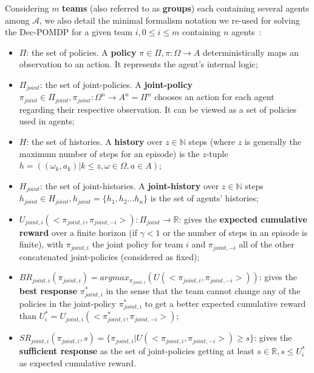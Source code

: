 \documentclass[doubleblind]{ecai}
\begin{document}
Considering $m$ \textbf{teams} (also referred to as \textbf{groups}) each containing several agents among $\mathcal{A}$, we also detail the minimal formalism notation we re-used for solving the Dec-POMDP for a given team $i, 0 \leq i \leq m$ containing $n$ agents~\citep{Beynier2013,Albrecht2024}:

\begin{itemize}

    \item $\Pi$: the set of policies. A \textbf{policy} $\pi \in \Pi, \pi: \Omega \rightarrow A$ deterministically maps an observation to an action. It represents the agent's internal logic;
    \item $\Pi_{joint}$: the set of joint-policies. A \textbf{joint-policy} $\pi_{joint} \in \Pi_{joint}, \pi_{joint}: \Omega^n \rightarrow A^n = \Pi^n$ chooses an action for each agent regarding their respective observation. It can be viewed as a set of policies used in agents;
    \item $H$: the set of histories. A \textbf{history} over $z \in \mathbb{N}$ steps (where $z$ is generally the maximum number of steps for an episode) is the $z$-tuple $h = ((\omega_{k}, a_{k}) | k \leq z, \omega \in \Omega, a \in A)$;
    \item $H_{joint}$: the set of joint-histories. A \textbf{joint-history} over $z \in \mathbb{N}$ steps $h_{joint} \in H_{joint}, h_{joint} = \{h_1,h_2...h_n\}$ is the set of agents' histories;
    \item $U_{joint,i}(<\pi_{joint,i}, \pi_{joint,-i}>): \Pi_{joint} \rightarrow \mathbb{R}$: gives the \textbf{expected cumulative reward} over a finite horizon (if $\gamma < 1$ or the number of steps in an episode is finite), with $\pi_{joint,i}$ the joint policy for team $i$ and $\pi_{joint,-i}$ all of the other concatenated joint-policies (considered as fixed);
    \item $BR_{joint,i}(\pi_{joint,i}) = argmax_{\pi_{joint,i}}(U(<\pi_{joint,i},\pi_{joint,-i}>))$: gives the \textbf{best response} $\pi_{joint,i}^*$ in the sense that the team cannot change any of the policies in the joint-policy $\pi_{joint,i}^*$ to get a better expected cumulative reward than $U_i^* = U_{joint,i}(<\pi_{joint,i}^*, \pi_{joint,-i}>)$;
    \item $SR_{joint,i}(\pi_{joint,i}, s) = \{\pi_{joint,i} | U(<\pi_{joint,i},\pi_{joint,-i}>) \geq s\}$: gives the \textbf{sufficient response} as the set of joint-policies getting at least $s \in \mathbb{R}, s \leq U_i^*$ as expected cumulative reward.
\end{itemize}
\end{document}
